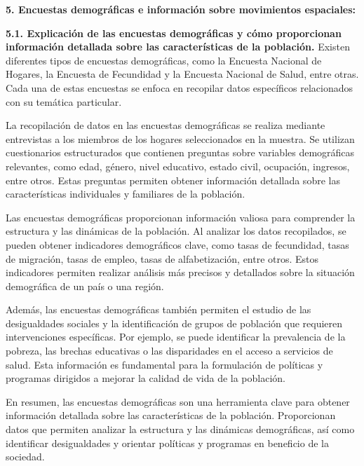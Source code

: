 \documentclass[8pt,a4paper]{beamer}
\begin{document}
{\begin{frame}{\textbf{5. Encuestas demográficas e información sobre movimientos espaciales:}}
\begin{block}{\textbf{5.1. Explicación de las encuestas demográficas y cómo proporcionan información detallada sobre las características de la población.}}
Existen diferentes tipos de encuestas demográficas, como la Encuesta Nacional de Hogares, la Encuesta de Fecundidad y la Encuesta Nacional de Salud, entre otras. Cada una de estas encuestas se enfoca en recopilar datos específicos relacionados con su temática particular.

La recopilación de datos en las encuestas demográficas se realiza mediante entrevistas a los miembros de los hogares seleccionados en la muestra. Se utilizan cuestionarios estructurados que contienen preguntas sobre variables demográficas relevantes, como edad, género, nivel educativo, estado civil, ocupación, ingresos, entre otros. Estas preguntas permiten obtener información detallada sobre las características individuales y familiares de la población.
\end{block}
\end{frame}

\begin{frame}{}
\begin{block}{}
\justifying
Las encuestas demográficas proporcionan información valiosa para comprender la estructura y las dinámicas de la población. Al analizar los datos recopilados, se pueden obtener indicadores demográficos clave, como tasas de fecundidad, tasas de migración, tasas de empleo, tasas de alfabetización, entre otros. Estos indicadores permiten realizar análisis más precisos y detallados sobre la situación demográfica de un país o una región.

Además, las encuestas demográficas también permiten el estudio de las desigualdades sociales y la identificación de grupos de población que requieren intervenciones específicas. Por ejemplo, se puede identificar la prevalencia de la pobreza, las brechas educativas o las disparidades en el acceso a servicios de salud. Esta información es fundamental para la formulación de políticas y programas dirigidos a mejorar la calidad de vida de la población.

En resumen, las encuestas demográficas son una herramienta clave para obtener información detallada sobre las características de la población. Proporcionan datos que permiten analizar la estructura y las dinámicas demográficas, así como identificar desigualdades y orientar políticas y programas en beneficio de la sociedad.
\end{block}
\end{frame}

}
\end{document}
